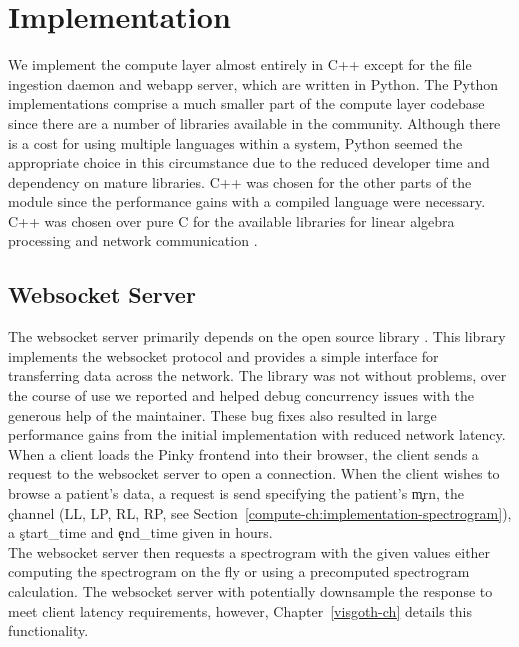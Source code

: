 \section{Implementation}

We implement the compute layer almost entirely in C++ except for the file
ingestion daemon and webapp server, which are written in Python. The Python
implementations comprise a much smaller part of the compute layer codebase
since there are a number of libraries available in the community. Although
there is a cost for using multiple languages within a system, Python seemed the
appropriate choice in this circumstance due to the reduced developer time and
dependency on mature libraries. C++ was chosen for the other parts of the
module since the performance gains with a compiled language were necessary. C++
was chosen over pure C for the available libraries for linear algebra
processing \cite{arma} and network communication \cite{websocket-server}.

\subsection{Websocket Server}\label{compute-ch:implementation-ws-server}

The websocket server primarily depends on the open source library
\cite{websocket-server}. This library implements the websocket protocol and
provides a simple interface for transferring data across the network. The
library was not without problems, over the course of use we reported and helped
debug concurrency issues with the generous help of the maintainer.  These bug
fixes also resulted in large performance gains from the initial implementation
with reduced network latency. \\

When a client loads the Pinky frontend into their browser, the client sends a
request to the websocket server to open a connection. When the client wishes to
browse a patient's data, a request is send specifying the patient's \c{mrn},
the \c{channel} (LL, LP, RL, RP, see
Section~\ref{compute-ch:implementation-spectrogram}), a \c{start\_time} and
\c{end\_time} given in hours. \\

The websocket server then requests a spectrogram with the given values either
computing the spectrogram on the fly or using a precomputed spectrogram
calculation. The websocket server with potentially downsample the response to
meet client latency requirements, however, Chapter~\ref{visgoth-ch} details
this functionality. \\

